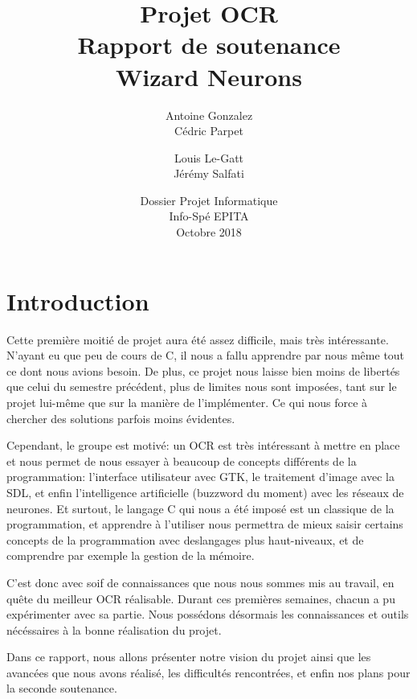 \documentclass[12pt]{report}
\begin{document}
\title{
	{\Huge Projet OCR}\\
	\vspace{2em}
	{\Huge Rapport de soutenance}\\
	{\large Wizard Neurons}
}
\author{
	Antoine Gonzalez\\
	Cédric Parpet
	\and
	Louis Le-Gatt\\
	Jérémy Salfati}
\date{
	\vspace{15em}
	{Dossier Projet Informatique\\
	Info-Spé EPITA\\
	Octobre 2018}
}

\maketitle
\newpage
\newpage
\tableofcontents

\chapter{Introduction}

Cette première moitié de projet aura été assez difficile, mais très intéressante. N'ayant eu que peu de cours de C, il nous a fallu apprendre par nous même tout ce dont nous avions besoin. De plus, ce projet nous laisse bien moins de libertés que celui du semestre précédent, plus de limites nous sont imposées, tant sur le projet lui-même que sur la manière de l'implémenter. Ce qui nous force à chercher des solutions parfois moins évidentes.

Cependant, le groupe est motivé: un OCR est très intéressant à mettre en place et nous permet de nous essayer à beaucoup de concepts différents de la programmation: l'interface utilisateur avec GTK, le traitement d'image avec la SDL, et enfin l'intelligence artificielle (buzzword du moment) avec les réseaux de neurones. Et surtout, le langage C qui nous a été imposé est un classique de la programmation, et apprendre à l'utiliser nous permettra de mieux saisir certains concepts de la programmation avec deslangages plus haut-niveaux, et de comprendre par exemple la gestion de la mémoire.

C'est donc avec soif de connaissances que nous nous sommes mis au travail, en quête du meilleur OCR réalisable. Durant ces premières semaines, chacun a pu expérimenter avec sa partie. Nous possédons désormais les connaissances et outils nécéssaires à la bonne réalisation du projet.

Dans ce rapport, nous allons présenter notre vision du projet ainsi que les avancées que nous avons réalisé, les difficultés rencontrées, et enfin nos plans pour la seconde soutenance.
\end{document}
